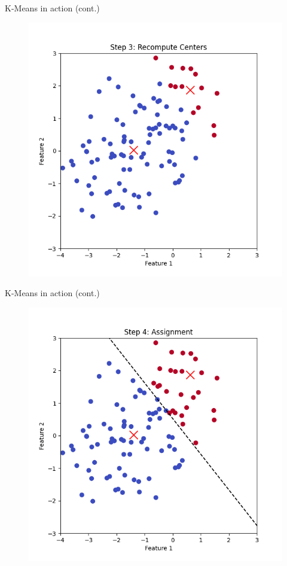 \documentclass[serif, aspectratio=169]{beamer}
\begin{document}
\begin{frame}{K-Means in action (cont.)}
    \begin{figure}
        \centering
        \includegraphics[scale=0.45]{pic/figs/kmeans_step_3_recompute_centers.png}
    \end{figure}
\end{frame}
\begin{frame}{K-Means in action (cont.)}
    \begin{figure}
        \centering
        \includegraphics[scale=0.45]{pic/figs/kmeans_step_4_assignment.png}
    \end{figure}
\end{frame}
\end{document}
